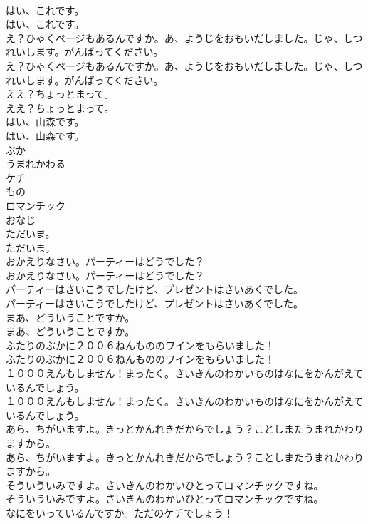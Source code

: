 \documentclass[8pt]{extreport}
\begin{document}
\begin{CJK}{UTF8}{min}
\\	はい、これです。	
\\	はい、これです。 
\\	え？ひゃくページもあるんですか。あ、ようじをおもいだしました。じゃ、しつれいします。がんばってください。	
\\	え？ひゃくページもあるんですか。あ、ようじをおもいだしました。じゃ、しつれいします。がんばってください。 
\\	ええ？ちょっとまって。	
\\	ええ？ちょっとまって。 
\\	はい、山森です。	
\\	はい、山森です。 
\\	ぶか
\\	うまれかわる
\\	ケチ
\\	もの
\\	ロマンチック
\\	おなじ
\\	ただいま。	
\\	ただいま。 
\\	おかえりなさい。パーティーはどうでした？	
\\	おかえりなさい。パーティーはどうでした？ 
\\	パーティーはさいこうでしたけど、プレゼントはさいあくでした。	
\\	パーティーはさいこうでしたけど、プレゼントはさいあくでした。 
\\	まあ、どういうことですか。	
\\	まあ、どういうことですか。 
\\	ふたりのぶかに２００６ねんもののワインをもらいました！	
\\	ふたりのぶかに２００６ねんもののワインをもらいました！ 
\\	１０００えんもしません！まったく。さいきんのわかいものはなにをかんがえているんでしょう。	
\\	１０００えんもしません！まったく。さいきんのわかいものはなにをかんがえているんでしょう。 
\\	あら、ちがいますよ。きっとかんれきだからでしょう？ことしまたうまれかわりますから。	
\\	あら、ちがいますよ。きっとかんれきだからでしょう？ことしまたうまれかわりますから。 
\\	そういういみですよ。さいきんのわかいひとってロマンチックですね。	
\\	そういういみですよ。さいきんのわかいひとってロマンチックですね。 
\\	なにをいっているんですか。ただのケチでしょう！	

\end{CJK}
\end{document}
